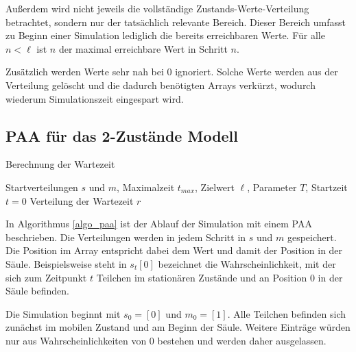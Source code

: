 Außerdem wird nicht jeweils die vollständige Zustands-Werte-Verteilung betrachtet, sondern nur der tatsächlich relevante Bereich. Dieser Bereich umfasst zu Beginn einer Simulation lediglich die bereits erreichbaren Werte. Für alle $n<\ell$ ist $n$ der maximal erreichbare Wert in Schritt $n$.

Zusätzlich werden Werte sehr nah bei $0$ ignoriert. Solche Werte werden aus der Verteilung gelöscht und die dadurch benötigten Arrays verkürzt, wodurch wiederum Simulationszeit eingespart wird.




\subsection{PAA für das 2-Zustände Modell}

\begin{algorithm}
\caption{Berechnung der Wartezeit}
\label{algo_paa}
\begin{algorithmic}[1]
\REQUIRE Startverteilungen $s$ und $m$, Maximalzeit $t_{max}$, Zielwert $\ell$, Parameter $T$, Startzeit $t=0$
\ENSURE Verteilung der Wartezeit
\ELSE
{}
\ENDIF
{}
\ENDWHILE
\RETURN $r$
\end{algorithmic}
\end{algorithm}

In Algorithmus \ref{algo_paa} ist der Ablauf der Simulation mit einem PAA beschrieben. Die Verteilungen werden in jedem Schritt in $s$ und $m$ gespeichert. Die Position im Array entspricht dabei dem Wert und damit der Position in der Säule. 
Beispielsweise steht in $s_t[0]$ bezeichnet die Wahrscheinlichkeit, mit der sich zum Zeitpunkt $t$ Teilchen im stationären Zustände und an Position $0$ in der Säule befinden.

Die Simulation beginnt mit $s_0 = [0]$ und $m_0 = [1]$. Alle Teilchen befinden sich zunächst im mobilen Zustand und am Beginn der Säule. Weitere Einträge würden nur aus Wahrscheinlichkeiten von $0$ bestehen und werden daher ausgelassen.

